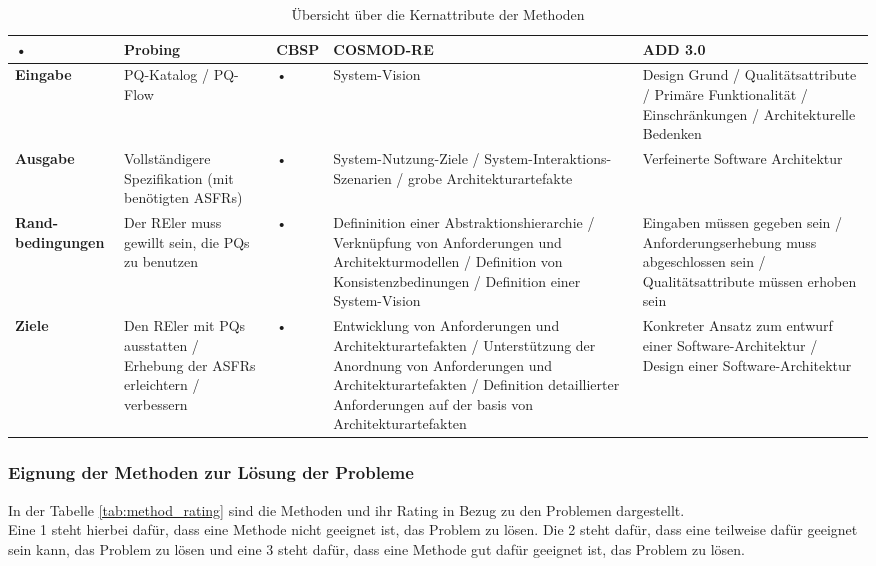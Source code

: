 \begin{table*}[t]
\caption{Übersicht über die Kernattribute der Methoden}
\centering
\begin{tabular}{|p{}|p{}|p{}|p{}|p{}|}%
\hline 
\rule[-1ex]{0pt}{2.5ex} • & \textbf{Probing} &  \textbf{CBSP} & \textbf{COSMOD-RE} & \textbf{ADD 3.0} \\ 
\hline 
\rule[-1ex]{0pt}{2.5ex}  \textbf{Eingabe} &  PQ-Katalog / PQ-Flow & • &  System-Vision & Design Grund / Qualitätsattribute / Primäre Funktionalität / Einschränkungen / Architekturelle Bedenken \\ 
\hline 
\rule[-1ex]{0pt}{2.5ex} \textbf{Ausgabe} & Vollständigere Spezifikation (mit benötigten ASFRs) & • &  System-Nutzung-Ziele / System-Interaktions-Szenarien / grobe Architekturartefakte &  Verfeinerte Software Architektur \\ 
\hline 
\rule[-1ex]{0pt}{2.5ex}  \textbf{Rand-bedingungen} &  Der REler muss gewillt sein, die PQs zu benutzen & • &  Defininition einer Abstraktionshierarchie / Verknüpfung von Anforderungen und Architekturmodellen / Definition von Konsistenzbedinungen / Definition einer System-Vision &  Eingaben müssen gegeben sein / Anforderungserhebung muss abgeschlossen sein / Qualitätsattribute müssen erhoben sein \\ 
\hline 
\rule[-1ex]{0pt}{2.5ex}  \textbf{Ziele} &  Den REler mit PQs ausstatten / Erhebung der ASFRs erleichtern / verbessern & • &  Entwicklung von Anforderungen und Architekturartefakten / Unterstützung der Anordnung von Anforderungen und Architekturartefakten / Definition detaillierter Anforderungen auf der basis von Architekturartefakten &  Konkreter Ansatz zum entwurf einer Software-Architektur / Design einer Software-Architektur \\ 
\hline 
\end{tabular} 
\label{tab:method_intro}
\end{table*}


\subsubsection{Eignung der Methoden zur Lösung der Probleme}
In der Tabelle \ref{tab:method_rating} sind die Methoden und ihr Rating in Bezug zu den Problemen dargestellt.\\

Eine 1 steht hierbei dafür, dass eine Methode nicht geeignet ist, das Problem zu lösen. Die 2 steht dafür, dass eine teilweise dafür geeignet sein kann, das Problem zu lösen und eine 3 steht dafür, dass eine Methode gut dafür geeignet ist, das Problem zu lösen.\\

